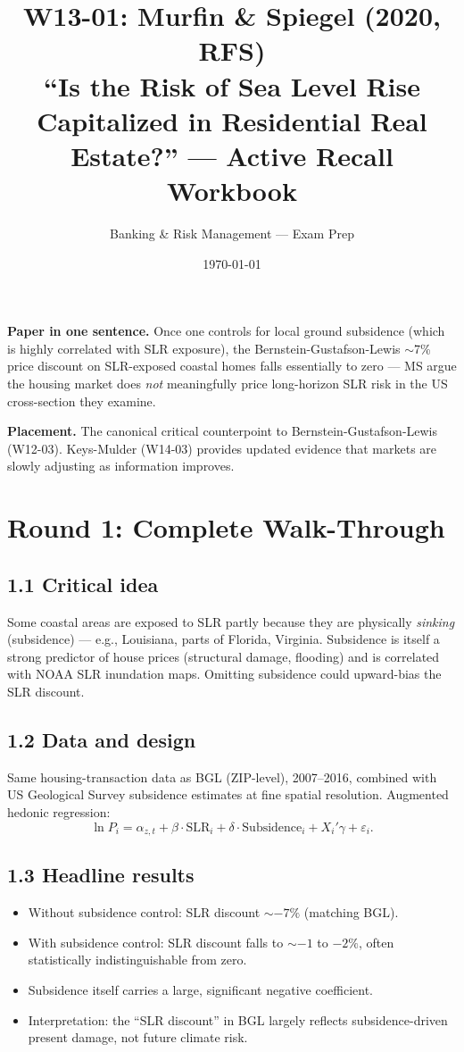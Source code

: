 \documentclass[11pt]{article}
\title{W13-01: Murfin \& Spiegel (2020, RFS) \\
\large ``Is the Risk of Sea Level Rise Capitalized in Residential Real Estate?'' --- Active Recall Workbook}
\author{Banking \& Risk Management --- Exam Prep}
\date{\today}
\begin{document}
\maketitle

\begin{keybox}
\textbf{Paper in one sentence.} Once one controls for local ground subsidence (which is highly correlated with SLR exposure), the Bernstein-Gustafson-Lewis $\sim$7\% price discount on SLR-exposed coastal homes falls essentially to zero --- MS argue the housing market does \emph{not} meaningfully price long-horizon SLR risk in the US cross-section they examine.

\textbf{Placement.} The canonical critical counterpoint to Bernstein-Gustafson-Lewis (W12-03). Keys-Mulder (W14-03) provides updated evidence that markets are slowly adjusting as information improves.
\end{keybox}

\section*{Round 1: Complete Walk-Through}

\subsection*{1.1 Critical idea}
Some coastal areas are exposed to SLR partly because they are physically \emph{sinking} (subsidence) --- e.g., Louisiana, parts of Florida, Virginia. Subsidence is itself a strong predictor of house prices (structural damage, flooding) and is correlated with NOAA SLR inundation maps. Omitting subsidence could upward-bias the SLR discount.

\subsection*{1.2 Data and design}
Same housing-transaction data as BGL (ZIP-level), 2007--2016, combined with US Geological Survey subsidence estimates at fine spatial resolution. Augmented hedonic regression:
\[
\ln P_i=\alpha_{z,t}+\beta\cdot\text{SLR}_i+\delta\cdot\text{Subsidence}_i+X_i'\gamma+\varepsilon_i.
\]

\subsection*{1.3 Headline results}
\begin{itemize}
\item Without subsidence control: SLR discount $\sim$$-7\%$ (matching BGL).
\item With subsidence control: SLR discount falls to $\sim$$-1$ to $-2\%$, often statistically indistinguishable from zero.
\item Subsidence itself carries a large, significant negative coefficient.
\item Interpretation: the ``SLR discount'' in BGL largely reflects subsidence-driven present damage, not future climate risk.
\end{itemize}
\end{document}
